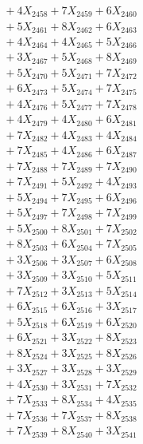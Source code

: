 \documentclass[a4paper,10pt]{article}
\begin{document}
{\begin{align}
&\;  + 4 X_{2458} + 7 X_{2459} + 6 X_{2460} \\[0.3ex]
&\;  + 5 X_{2461} + 8 X_{2462} + 6 X_{2463} \\[0.3ex]
&\;  + 4 X_{2464} + 4 X_{2465} + 5 X_{2466} \\[0.3ex]
&\;  + 3 X_{2467} + 5 X_{2468} + 8 X_{2469} \\[0.5ex]\allowbreak
&\;  + 5 X_{2470} + 5 X_{2471} + 7 X_{2472} \\[0.3ex]
&\;  + 6 X_{2473} + 5 X_{2474} + 7 X_{2475} \\[0.3ex]
&\;  + 4 X_{2476} + 5 X_{2477} + 7 X_{2478} \\[0.3ex]
&\;  + 4 X_{2479} + 4 X_{2480} + 6 X_{2481} \\[0.3ex]
&\;  + 7 X_{2482} + 4 X_{2483} + 4 X_{2484} \\[0.3ex]
&\;  + 7 X_{2485} + 4 X_{2486} + 6 X_{2487} \\[0.3ex]
&\;  + 7 X_{2488} + 7 X_{2489} + 7 X_{2490} \\[0.3ex]
&\;  + 7 X_{2491} + 5 X_{2492} + 4 X_{2493} \\[0.3ex]
&\;  + 5 X_{2494} + 7 X_{2495} + 6 X_{2496} \\[0.3ex]
&\;  + 5 X_{2497} + 7 X_{2498} + 7 X_{2499} \\[0.5ex]\allowbreak
&\;  + 5 X_{2500} + 8 X_{2501} + 7 X_{2502} \\[0.3ex]
&\;  + 8 X_{2503} + 6 X_{2504} + 7 X_{2505} \\[0.3ex]
&\;  + 3 X_{2506} + 3 X_{2507} + 6 X_{2508} \\[0.3ex]
&\;  + 3 X_{2509} + 3 X_{2510} + 5 X_{2511} \\[0.3ex]
&\;  + 7 X_{2512} + 3 X_{2513} + 5 X_{2514} \\[0.3ex]
&\;  + 6 X_{2515} + 6 X_{2516} + 3 X_{2517} \\[0.3ex]
&\;  + 5 X_{2518} + 6 X_{2519} + 6 X_{2520} \\[0.3ex]
&\;  + 6 X_{2521} + 3 X_{2522} + 8 X_{2523} \\[0.3ex]
&\;  + 8 X_{2524} + 3 X_{2525} + 8 X_{2526} \\[0.3ex]
&\;  + 3 X_{2527} + 3 X_{2528} + 3 X_{2529} \\[0.5ex]\allowbreak
&\;  + 4 X_{2530} + 3 X_{2531} + 7 X_{2532} \\[0.3ex]
&\;  + 7 X_{2533} + 8 X_{2534} + 4 X_{2535} \\[0.3ex]
&\;  + 7 X_{2536} + 7 X_{2537} + 8 X_{2538} \\[0.3ex]
&\;  + 7 X_{2539} + 8 X_{2540} + 3 X_{2541} \\[0.3ex]

\end{align}}
\end{document}
